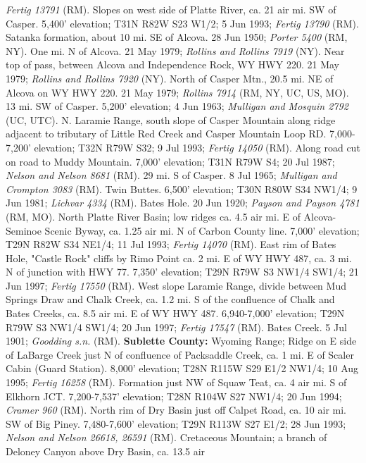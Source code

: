 \textit{Fertig 13791} (RM).
Slopes on west side of Platte River, ca. 21 air mi. SW of Casper.
5,400’ elevation; T31N R82W S23 W1/2; 5 Jun 1993; \textit{Fertig 13790} (RM).
Satanka formation, about 10 mi. SE of Alcova. 28 Jun 1950;
\textit{Porter 5400} (RM, NY).
One mi. N of Alcova. 21 May 1979; \textit{Rollins and Rollins 7919} (NY).
Near top of pass, between Alcova and Independence Rock, WY HWY 220.
21 May 1979; \textit{Rollins and Rollins 7920} (NY).
North of Casper Mtn., 20.5 mi. NE of Alcova on WY HWY 220. 21 May 1979;
\textit{Rollins 7914} (RM, NY, UC, US, MO).
13 mi. SW of Casper. 5,200’ elevation; 4 Jun 1963;
\textit{Mulligan and Mosquin 2792} (UC, UTC).
N. Laramie Range, south slope of Casper Mountain along ridge adjacent to
tributary of Little Red Creek and Casper Mountain Loop RD.
7,000-7,200’ elevation; T32N R79W S32; 9 Jul 1993; \textit{Fertig 14050} (RM).
Along road cut on road to Muddy Mountain. 7,000’ elevation; T31N R79W S4;
20 Jul 1987; \textit{Nelson and Nelson 8681} (RM).
29 mi. S of Casper. 8 Jul 1965; \textit{Mulligan and Crompton 3083} (RM).
Twin Buttes. 6,500’ elevation; T30N R80W S34 NW1/4; 9 Jun 1981;
\textit{Lichvar 4334} (RM).
Bates Hole. 20 Jun 1920; \textit{Payson and Payson 4781} (RM, MO).
North Platte River Basin; low ridges ca. 4.5 air mi. E of Alcova-Seminoe Scenic
Byway, ca. 1.25 air mi. N of Carbon County line. 7,000’ elevation;
T29N R82W S34 NE1/4; 11 Jul 1993; \textit{Fertig 14070} (RM).
East rim of Bates Hole, "Castle Rock" cliffs by Rimo Point ca. 2 mi. E of WY
HWY 487, ca. 3 mi. N of junction with HWY 77. 7,350’ elevation; T29N R79W S3
NW1/4 SW1/4; 21 Jun 1997; \textit{Fertig 17550} (RM).
West slope Laramie Range, divide between Mud Springs Draw and Chalk Creek,
ca. 1.2 mi. S of the confluence of Chalk and Bates Creeks, ca. 8.5 air mi. E of
WY HWY 487. 6,940-7,000' elevation; T29N R79W S3 NW1/4 SW1/4; 20 Jun 1997;
\textit{Fertig 17547} (RM).
Bates Creek. 5 Jul 1901; \textit{Goodding s.n.} (RM).
  \textbf{Sublette County:}
Wyoming Range; Ridge on E side of LaBarge Creek just N of confluence of
Packsaddle Creek, ca. 1 mi. E of Scaler Cabin (Guard Station).
8,000’ elevation; T28N R115W S29 E1/2 NW1/4; 10 Aug 1995;
\textit{Fertig 16258} (RM).
Formation just NW of Squaw Teat, ca. 4 air mi. S of Elkhorn JCT.
7,200-7,537' elevation; T28N R104W S27 NW1/4; 20 Jun 1994;
\textit{Cramer 960} (RM).
North rim of Dry Basin just off Calpet Road, ca. 10 air mi. SW of Big Piney.
7,480-7,600’ elevation; T29N R113W S27 E1/2; 28 Jun 1993;
\textit{Nelson and Nelson 26618, 26591} (RM).
Cretaceous Mountain; a branch of Deloney Canyon above Dry Basin, ca. 13.5 air
